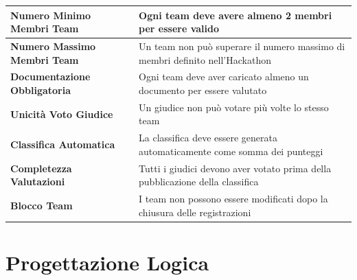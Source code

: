 \documentclass[a4paper, 11pt]{article}
\begin{document}
{\begin{longtable}{
				>{\raggedright\arraybackslash}p{5.5cm}
				>{\raggedright\arraybackslash}p{10cm}
			}
			\textbf{Numero Minimo Membri Team} &
			Ogni team deve avere almeno 2 membri per essere valido \\
			\hline
			
			\textbf{Numero Massimo Membri Team} &
			Un team non può superare il numero massimo di membri definito nell'Hackathon \\
			\hline
			
			\textbf{Documentazione Obbligatoria} &
			Ogni team deve aver caricato almeno un documento per essere valutato \\
			\hline
			
			\textbf{Unicità Voto Giudice} &
			Un giudice non può votare più volte lo stesso team\\
			\hline
			
			\textbf{Classifica Automatica} &
			La classifica deve essere generata automaticamente come somma dei punteggi\\
			\hline
			
			\textbf{Completezza Valutazioni} &
			Tutti i giudici devono aver votato prima della pubblicazione della classifica \\
			\hline
			
			\textbf{Blocco Team} &
			I team non possono essere modificati dopo la chiusura delle registrazioni
		\end{longtable}
	}
	\newpage
	\section{Progettazione Logica}
\end{document}
